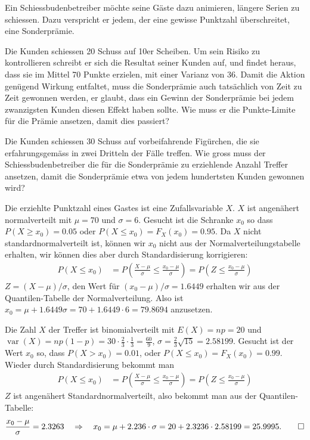 Ein Schiessbudenbetreiber möchte seine Gäste dazu animieren,
längere Serien zu schiessen. Dazu verspricht er jedem, der eine
gewisse Punktzahl überschreitet, eine Sonderprämie.
\begin{teilaufgaben}
\item
Die Kunden schiessen 20 Schuss auf 10er Scheiben. Um sein Risiko
zu kontrollieren schreibt er sich die Resultat seiner Kunden auf,
und findet heraus, dass sie im Mittel 70 Punkte erzielen, mit einer
Varianz von 36. Damit die Aktion genügend Wirkung entfaltet,
muss die Sonderprämie auch tatsächlich von Zeit zu Zeit
gewonnen werden, er glaubt, dass ein Gewinn der Sonderprämie
bei jedem zwanzigsten Kunden diesen Effekt haben sollte. Wie
muss er die Punkte-Limite für die Prämie ansetzen, damit dies
passiert?
\item
Die Kunden schiessen 30 Schuss auf vorbeifahrende Figürchen, die
sie erfahrungsgemäss in zwei Dritteln der Fälle treffen. Wie
gross muss der Schiessbudenbetreiber die für die Sonderprämie
zu erziehlende Anzahl Treffer ansetzen, damit die Sonderprämie
etwa von jedem hundertsten Kunden gewonnen wird?
\end{teilaufgaben}

\begin{loesung}
\begin{teilaufgaben}
\item
Die erziehlte Punktzahl eines Gastes ist eine Zufallsvariable $X$.
$X$ ist angenähert normalverteilt mit $\mu=70$ und
$\sigma=6$. Gesucht ist die Schranke $x_0$ so dass
$P(X\ge x_0)=0.05$ oder $P(X\le x_0)=F_X(x_0)=0.95$.
Da $X$ nicht standardnormalverteilt ist, können wir $x_0$ nicht
aus der Normalverteilungstabelle erhalten, wir können dies aber
durch Standardisierung korrigieren:
\begin{align*}
P(X\le x_0)
&=
P\left(\frac{X-\mu}{\sigma}\le\frac{x_0-\mu}{\sigma}\right)
=
P\left(Z\le \frac{x_0-\mu}{\sigma}\right)
\end{align*}
$Z=(X-\mu)/\sigma$, den Wert für $(x_0-\mu)/\sigma=1.6449$ erhalten
wir aus der Quantilen-Tabelle der Normalverteilung. Also ist
$x_0=\mu +1.6449\sigma=70 + 1.6449\cdot 6=79.8694$ anzusetzen.
\item
Die Zahl $X$ der Treffer ist binomialverteilt mit $E(X) = np=20$ und
$\operatorname{var}(X)=np(1-p)=30\cdot\frac23\cdot\frac13=\frac{60}{9}$,
$\sigma = \frac23\sqrt{15}=2.58199$.
Gesucht ist der Wert $x_0$ so, dass $P(X>x_0)=0.01$, oder
$P(X\le x_0)=F_X(x_0)=0.99$. Wieder durch Standardisierung bekommt
man
\begin{align*}
P(X\le x_0)
&=
P\left(
\frac{X-\mu}{\sigma}\le\frac{x_0-\mu}{\sigma}
\right)
=
P\left(
Z\le \frac{x_0-\mu}{\sigma}
\right)
\end{align*}
$Z$ ist angenähert Standardnormalverteilt, also bekommt man aus
der Quantilen-Tabelle:
\[
\frac{x_0-\mu}{\sigma}=2.3263
\quad
\Rightarrow
\quad
x_0=\mu+2.236\cdot \sigma=20 + 2.3236\cdot 2.58199 = 25.9995.
\qedhere
\]
\end{teilaufgaben}
\end{loesung}

